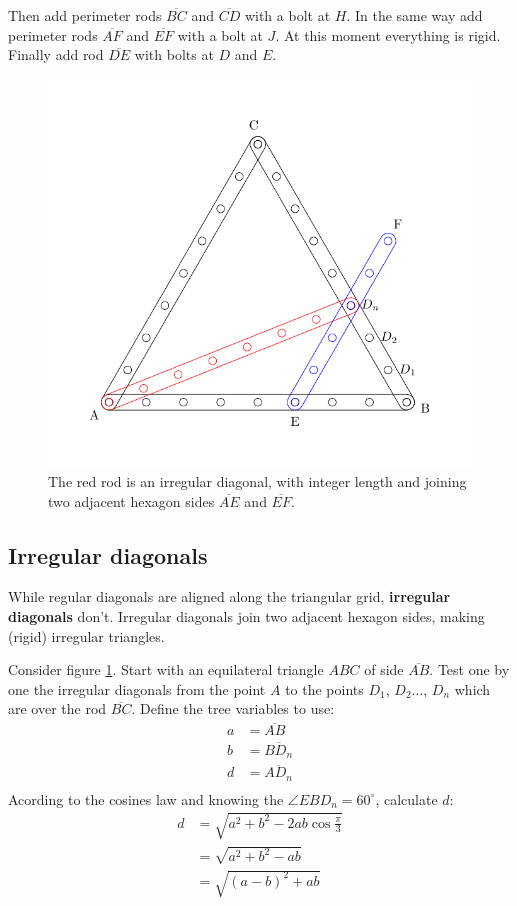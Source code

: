 \documentclass[11pt]{article}
\begin{document}
Then add perimeter rods $\overline{BC}$ and $\overline{CD}$ with a bolt at $H$.
In the same way add perimeter rods $\overline{AF}$ and $\overline{EF}$ with a bolt at $J$.
At this moment everything is rigid. Finally add rod $\overline{DE}$ with bolts at $D$ and $E$.



\begin{figure}[htpb]
\centering
\includegraphics[scale=0.8]{hexagon_angle}
\caption{The red rod is an irregular diagonal, with integer length 
and joining two adjacent hexagon sides $\overline{AE}$ and $\overline{EF}$.}
\label{fig:irregular}
\end{figure}

\subsection{Irregular diagonals}

While regular diagonals are aligned along the triangular grid, \textbf{irregular diagonals}
don't. Irregular diagonals join two adjacent hexagon sides, making (rigid) irregular triangles.

Consider figure \ref{fig:irregular}.
Start with an equilateral triangle $ABC$ of side $\overline{AB}$.
Test one by one the irregular diagonals from the point $A$ to the points $D_1$, $D_2$..., $D_n$
which are over the rod $\overline{BC}$. Define the tree variables to use:
\begin{align*}
a &= \overline{AB}\\
b &= \overline{BD_n}\\
d &= \overline{AD_n}\\
\end{align*}
Acording to the cosines law and knowing the $\angle{EBD_n} = 60^\circ{}$, calculate $d$:
\begin{align*}
d &= \sqrt{a^2 + b^2 - 2ab\cos{\frac{\pi}{3}}}\\
  &= \sqrt{a^2 + b^2 - ab}\\
  &= \sqrt{(a-b)^2 + ab}\\
\end{align*}
\end{document}
